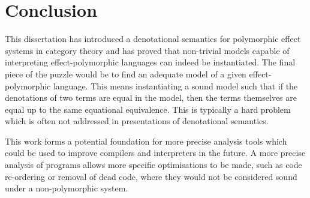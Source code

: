 \documentclass{Report}
\begin{document}
\chapter{Conclusion}
This dissertation has introduced a denotational semantics for polymorphic effect systems in category theory and has proved that non-trivial models capable of interpreting effect-polymorphic languages can indeed be instantiated. The final piece of the puzzle would be to find an adequate model of a given effect-polymorphic language. This means instantiating a sound model such that if the denotations of two terms are equal in the model, then the terms themselves are equal up to the same equational equivalence. This is typically a hard problem which is often not addressed in presentations of denotational semantics.

This work forms a potential foundation for more precise analysis tools which could be used to improve compilers and interpreters in the future. A more precise analysis of programs allows more specific optimisations to be made, such as code re-ordering or removal of dead code, where they would not be considered sound under a non-polymorphic system.


 

\end{document}
